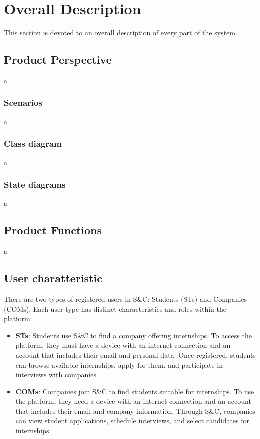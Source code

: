 \chapter{Overall Description}
This section is devoted to an overall description of every part of the system.

\section{Product Perspective}
a

\subsection{Scenarios}
a

\subsection{Class diagram}
a

\subsection{State diagrams}
a

\section{Product Functions}
a


\section{User charatteristic}
There are two types of registered users in S\&C: Students (STs) and Companies (COMs). Each user type has distinct characteristics and roles within the platform:

\begin{itemize}
    \item \textbf{STs}: Students use S\&C to find a company offering internships. To access the platform, they must have a device with an internet connection and an account that includes their email and personal data. Once registered, students can browse available internships, apply for them, and participate in interviews with 
    companies

    \item \textbf{COMs}:  Companies join S\&C to find students suitable for internships. To use the platform, they need a device with an internet connection and an account that includes their email and company information. Through S\&C, companies can view student applications, schedule interviews, and select candidates for internships.
\end{itemize}

